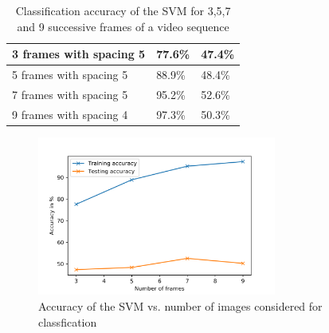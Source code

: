 \documentclass[11pt]{report}
\begin{document}
\begin{table}[]
\centering
\begin{tabular}{|l|l|l|}
\hline
3 frames with spacing 5 & 77.6\% & 47.4\% \\ \hline
5 frames with spacing 5 & 88.9\% & 48.4\% \\ \hline
7 frames with spacing 5 & 95.2\% & 52.6\% \\ \hline
9 frames with spacing 4 & 97.3\% & 50.3\% \\ \hline
\end{tabular}
\caption{Classification accuracy of the SVM for 3,5,7 and 9 successive frames of a video sequence}
\label{result_table_SMV}
\end{table}

\begin{figure}
  \centering
  \includegraphics[width=0.7\textwidth]{AccuracySVM.png}
  \caption{Accuracy of the SVM vs. number of images considered for classfication}
  \label{result_fig_svm}
\end{figure}



\end{document}
